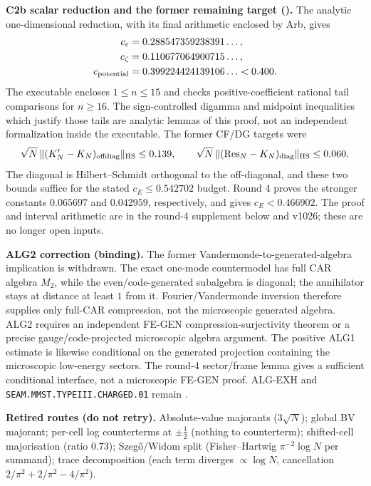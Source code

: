 \documentclass[11pt,a4paper]{article}
\begin{document}
\par\smallskip\noindent\textbf{C2b scalar reduction and the former remaining target
().}
The analytic one-dimensional reduction, with its final arithmetic enclosed by Arb,
gives
\[
 \begin{aligned}
 c_\varepsilon&=0.288547359238391\ldots,\\
 c_\zeta&=0.110677064900715\ldots,\\
 c_{\rm potential}&=0.399224424139106\ldots<0.400.
 \end{aligned}
\]
The executable encloses $1\le n\le15$ and checks positive-coefficient rational
tail comparisons for $n\ge16$.  The sign-controlled digamma and midpoint
inequalities which justify those tails are analytic lemmas of this proof, not an
independent formalization inside the executable. The former CF/DG targets were
\[
 \sqrt N\,\lVert(K'_N-K_N)_{\rm offdiag}\rVert_{\mathrm{HS}}\le0.139,
 \qquad
 \sqrt N\,\lVert(\mathrm{Res}_N-K_N)_{\rm diag}\rVert_{\mathrm{HS}}\le0.060.
\]
The diagonal is Hilbert--Schmidt orthogonal to the off-diagonal, and these two
bounds suffice for the stated $c_E\le0.542702$ budget. Round 4 proves the
stronger constants $0.065697$ and $0.042959$, respectively, and gives
$c_E<0.466902$. The proof and interval arithmetic are in the round-4
supplement below and v1026; these are no longer open inputs.

\par\smallskip\noindent\textbf{ALG2 correction (binding).}
The former Vandermonde-to-generated-algebra implication is withdrawn.  The exact
one-mode countermodel has full CAR algebra $M_2$, while the even/code-generated
subalgebra is diagonal; the annihilator stays at distance at least $1$ from it.
Fourier/Vandermonde inversion therefore supplies only full-CAR compression, not the
microscopic generated algebra.  ALG2 requires an independent FE-GEN
compression-surjectivity theorem or a precise gauge/code-projected microscopic
algebra argument.  The positive ALG1 estimate is likewise conditional on the
generated projection containing the microscopic low-energy sectors.
The round-4 sector/frame lemma gives a sufficient conditional interface, not
a microscopic FE-GEN proof. ALG-EXH and
\texttt{SEAM.MMST.TYPEIII.CHARGED.01} remain \mO.

\par\smallskip\noindent\textbf{Retired routes (do not retry).}
Absolute-value majorants ($3\sqrt N$); global BV
majorant; per-cell log counterterms at $\pm\tfrac12$ (nothing to counterterm);
shifted-cell majorisation (ratio $0.73$); Szeg\H{o}/Widom split
(Fisher--Hartwig $\pi^{-2}\log N$ per summand); trace decomposition (each term
diverges $\propto\log N$, cancellation $2/\pi^2+2/\pi^2-4/\pi^2$).
\end{document}
